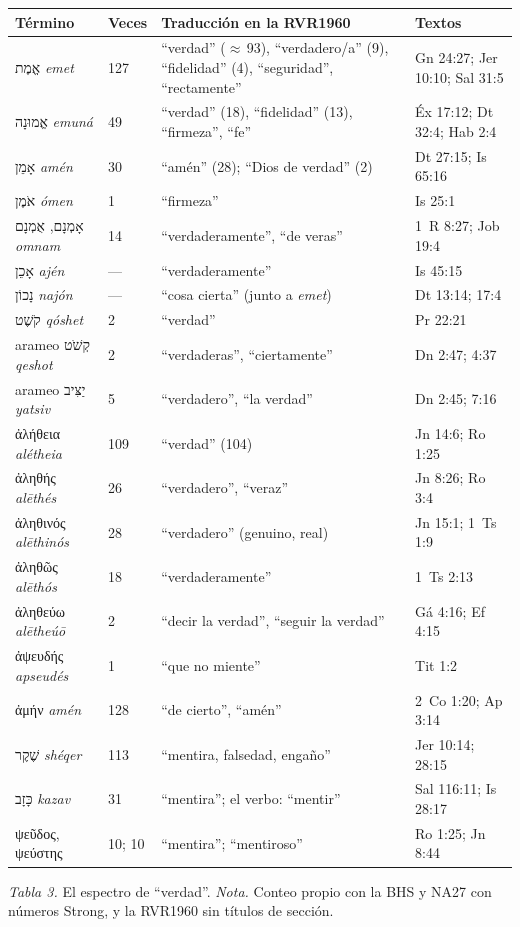\documentclass[11pt,letterpaper]{article}
\newcommand{\heb}[1]{\mbox{\foreignlanguage{hebrew}{#1}}}
\newcommand{\grc}[1]{\foreignlanguage{ancientgreek}{#1}}
\begin{document}
\begin{center}\small\renewcommand{\arraystretch}{1.16}
\begin{tabular}{@{}L{3.6cm}L{1.1cm}L{5.4cm}L{4.2cm}@{}}
\toprule
\textbf{Término} & \textbf{Veces} & \textbf{Traducción en la RVR1960} & \textbf{Textos} \\ \midrule
\heb{אֱמֶת} \emph{emet} & 127 & ``verdad'' ($\approx$\,93), ``verdadero/a'' (9), ``fidelidad'' (4), ``seguridad'', ``rectamente'' & Gn 24:27; Jer 10:10; Sal 31:5 \\
\heb{אֱמוּנָה} \emph{emuná} & 49 & ``verdad'' (18), ``fidelidad'' (13), ``firmeza'', ``fe'' & Éx 17:12; Dt 32:4; Hab 2:4 \\
\heb{אָמֵן} \emph{amén} & 30 & ``amén'' (28); ``Dios de verdad'' (2) & Dt 27:15; Is 65:16 \\
\heb{אֹמֶן} \emph{ómen} & 1 & ``firmeza'' & Is 25:1 \\
\heb{אָמְנָם}, \heb{אֻמְנָם} \emph{omnam} & 14 & ``verdaderamente'', ``de veras'' & 1~R 8:27; Job 19:4 \\
\heb{אָכֵן} \emph{ajén} & --- & ``verdaderamente'' & Is 45:15 \\
\heb{נָכוֹן} \emph{najón} & --- & ``cosa cierta'' (junto a \emph{emet}) & Dt 13:14; 17:4 \\
\heb{קֹשֶׁט} \emph{qóshet} & 2 & ``verdad'' & Pr 22:21 \\
arameo \heb{קְשֹׁט} \emph{qeshot} & 2 & ``verdaderas'', ``ciertamente'' & Dn 2:47; 4:37 \\
arameo \heb{יַצִּיב} \emph{yatsiv} & 5 & ``verdadero'', ``la verdad'' & Dn 2:45; 7:16 \\ \midrule
\grc{ἀλήθεια} \emph{alétheia} & 109 & ``verdad'' (104) & Jn 14:6; Ro 1:25 \\
\grc{ἀληθής} \emph{alēthés} & 26 & ``verdadero'', ``veraz'' & Jn 8:26; Ro 3:4 \\
\grc{ἀληθινός} \emph{alēthinós} & 28 & ``verdadero'' (genuino, real) & Jn 15:1; 1~Ts 1:9 \\
\grc{ἀληθῶς} \emph{alēthós} & 18 & ``verdaderamente'' & 1~Ts 2:13 \\
\grc{ἀληθεύω} \emph{alētheúō} & 2 & ``decir la verdad'', ``seguir la verdad'' & Gá 4:16; Ef 4:15 \\
\grc{ἀψευδής} \emph{apseudés} & 1 & ``que no miente'' & Tit 1:2 \\
\grc{ἀμήν} \emph{amén} & 128 & ``de cierto'', ``amén'' & 2~Co 1:20; Ap 3:14 \\ \midrule
\heb{שֶׁקֶר} \emph{shéqer} & 113 & ``mentira, falsedad, engaño'' & Jer 10:14; 28:15 \\
\heb{כָּזָב} \emph{kazav} & 31 & ``mentira''; el verbo: ``mentir'' & Sal 116:11; Is 28:17 \\
\grc{ψεῦδος}, \grc{ψεύστης} & 10; 10 & ``mentira''; ``mentiroso'' & Ro 1:25; Jn 8:44 \\
\bottomrule
\end{tabular}\par
{\footnotesize\color{gris}\textit{Tabla 3.} El espectro de ``verdad''. \textit{Nota.} Conteo propio con la BHS y NA27 con números Strong, y la RVR1960 sin títulos de sección.}
\end{center}
\end{document}
